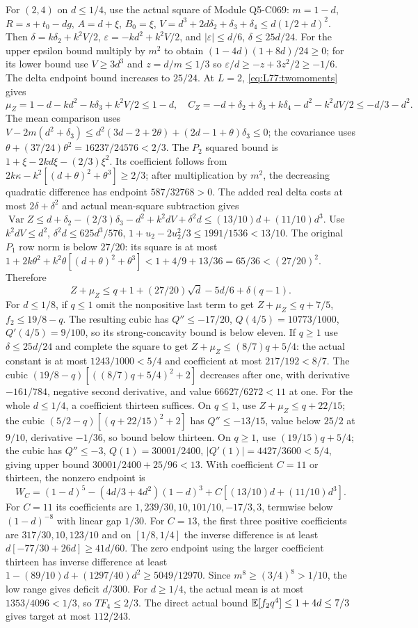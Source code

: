 For $(2,4)$ on $d\le1/4$, use the actual square of
Module Q5-C069: $m=1-d$, $R=s+t_0-dg$,
$A=d+\xi$, $B_0=\xi$,
$V=d^3+2d\delta_2+\delta_3+\delta_4\le d(1/2+d)^2$.
Then $\delta=k\delta_2+k^2V/2$,
$\varepsilon=-kd^2+k^2V/2$, and
$|\varepsilon|\le d/6$, $\delta\le25d/24$.
For the upper epsilon bound multiply by $m^2$ to obtain
$(1-4d)(1+8d)/24\ge0$; for its lower bound use $V\ge3d^3$ and
$z=d/m\le1/3$ so $\varepsilon/d\ge-z+3z^2/2\ge-1/6$.
The delta endpoint bound increases to $25/24$.
At $L=2$, \eqref{eq:L77:twomoments} gives
\[
\mu_Z=1-d-kd^2-k\delta_3+k^2V/2\le1-d,
\quad C_Z=-d+\delta_2+\delta_3+k\delta_4-d^2-k^2dV/2
\le-d/3-d^2.
\]
The mean comparison uses
$V-2m(d^2+\delta_3)
\le d^2(3d-2+2\theta)+(2d-1+\theta)\delta_3\le0$;
the covariance uses $\theta+(37/24)\theta^2=16237/24576<2/3$.
The $P_2$ squared bound is
$1+\xi-2kd\xi-(2/3)\xi^2$.
Its coefficient follows from
$2k\kappa-k^2[(d+\theta)^2+\theta^3]\ge2/3$;
after multiplication by $m^2$, the decreasing quadratic difference
has endpoint $587/32768>0$.
The added real delta costs at most $2\delta+\delta^2$ and actual
mean-square subtraction gives
$\operatorname{Var}Z\le d+\delta_2-(2/3)\delta_3-d^2
+k^2dV+\delta^2d\le(13/10)d+(11/10)d^3$.
Use $k^2dV\le d^2$, $\delta^2d\le625d^3/576$,
$1+u_2-2u_2^2/3\le1991/1536<13/10$.
The original $P_1$ row norm is below $27/20$:
its square is at most
$1+2k\theta^2+k^2\theta[(d+\theta)^2+\theta^3]
<1+4/9+13/36=65/36<(27/20)^2$.
Therefore
\[
Z+\mu_Z\le q+1+(27/20)\sqrt d-5d/6+\delta(q-1).
\]
For $d\le1/8$, if $q\le1$ omit the nonpositive last term to get
$Z+\mu_Z\le q+7/5$, $f_2\le19/8-q$.
The resulting cubic has $Q''\le-17/20$,
$Q(4/5)=10773/1000$, $Q'(4/5)=9/100$, so its strong-concavity
bound is below eleven.
If $q\ge1$ use $\delta\le25d/24$ and complete the square to get
$Z+\mu_Z\le(8/7)q+5/4$:
the actual constant is at most $1243/1000<5/4$ and coefficient at
most $217/192<8/7$.
The cubic $(19/8-q)[((8/7)q+5/4)^2+2]$ decreases after one,
with derivative $-161/784$, negative second derivative, and value
$66627/6272<11$ at one.
For the whole $d\le1/4$, a coefficient thirteen suffices.
On $q\le1$, use $Z+\mu_Z\le q+22/15$;
the cubic $(5/2-q)[(q+22/15)^2+2]$ has $Q''\le-13/15$,
value below $25/2$ at $9/10$, derivative $-1/36$, so bound below
thirteen. On $q\ge1$, use $(19/15)q+5/4$;
the cubic has $Q''\le-3$, $Q(1)=30001/2400$,
$|Q'(1)|=4427/3600<5/4$, giving upper bound
$30001/2400+25/96<13$.
With coefficient $C=11$ or thirteen, the nonzero endpoint is
\[
W_C=(1-d)^5-(4d/3+4d^2)(1-d)^3
+C[(13/10)d+(11/10)d^3].
\]
For $C=11$ its coefficients are
$1,239/30,10,101/10,-17/3,3$, termwise below $(1-d)^{-8}$ with
linear gap $1/30$.
For $C=13$, the first three positive coefficients are
$317/30,10,123/10$ and on $[1/8,1/4]$ the inverse difference is
at least $d[-77/30+26d]\ge41d/60$.
The zero endpoint using the larger coefficient thirteen has inverse
difference at least $1-(89/10)d+(1297/40)d^2\ge5049/12970$.
Since $m^8\ge(3/4)^8>1/10$, the low range gives deficit $d/300$.
For $d\ge1/4$, the actual mean is at most $1353/4096<1/3$,
so $TF_4\le2/3$. The direct actual bound
$\mathbb E[f_2q^4]\le1+4d\le7/3$ gives target at most $112/243$.

